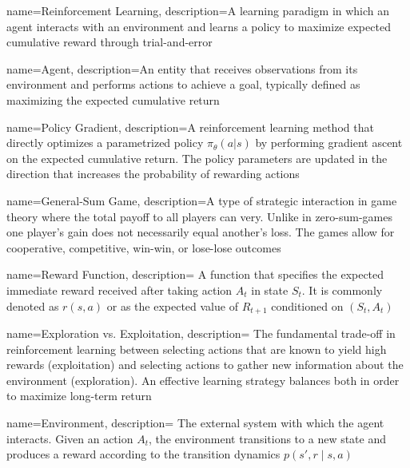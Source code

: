 {
    name={Reinforcement Learning},
    description={A learning paradigm in which an agent interacts with an environment and learns a policy to maximize expected cumulative reward through trial-and-error}
}

{
    name={Agent},
    description={An entity that receives observations from its environment and performs actions to achieve a goal, typically defined as maximizing the expected cumulative return}
}

{
    name={Policy Gradient},
    description={A reinforcement learning method that directly optimizes a parametrized policy $\pi_{\theta}(a|s)$ by performing gradient ascent on the expected cumulative return. The policy parameters are updated in the direction that increases the probability of rewarding actions \cite{sutton2018reinforcement}}
}

{
    name={General-Sum Game},
    description={A type of strategic interaction in game theory where the total payoff to all players can very. Unlike in zero-sum-games one player's gain does not necessarily equal another's loss. The games allow for cooperative, competitive, win-win, or lose-lose outcomes}
}

{
    name={Reward Function},
    description={
    A function that specifies the expected immediate reward received after 
    taking action $A_t$ in state $S_t$. It is commonly denoted as 
    $r(s,a)$ or as the expected value of $R_{t+1}$ conditioned on 
    $(S_t, A_t)$ \cite{sutton2018reinforcement}
    }
}

{
    name={Exploration vs. Exploitation},
    description={
    The fundamental trade-off in reinforcement learning between selecting 
    actions that are known to yield high rewards (exploitation) and selecting 
    actions to gather new information about the environment (exploration). 
    An effective learning strategy balances both in order to maximize 
    long-term return \cite{sutton2018reinforcement}
    }
}

{
    name={Environment},
    description={
    The external system with which the agent interacts. 
    Given an action $A_t$, the environment transitions to a new state and 
    produces a reward according to the transition dynamics 
    $p(s', r \mid s,a)$ \cite{sutton2018reinforcement}
    }
}

